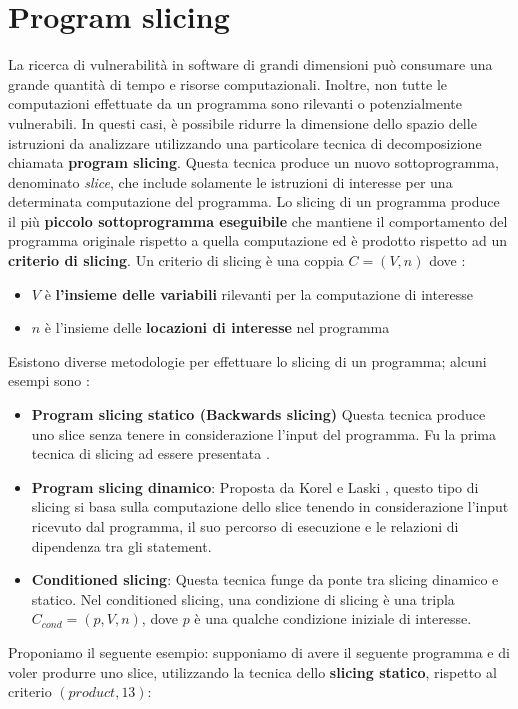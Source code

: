 \documentclass[../main.tex]{subfiles}
\begin{document}
\section{Program slicing}
La ricerca di vulnerabilità in software di grandi dimensioni può consumare una grande quantità di tempo e risorse computazionali.
Inoltre, non tutte le computazioni effettuate da un programma sono rilevanti o potenzialmente vulnerabili. 
In questi casi, è possibile ridurre la dimensione dello spazio delle istruzioni da analizzare utilizzando una particolare tecnica di decomposizione
chiamata \textbf{program slicing}.
Questa tecnica produce un nuovo sottoprogramma, denominato \textit{slice}, che include solamente le istruzioni di interesse per una determinata computazione del programma.
Lo slicing di un programma produce il più \textbf{piccolo sottoprogramma eseguibile} che mantiene il comportamento del programma originale rispetto a quella computazione ed è prodotto rispetto ad un \textbf{criterio di slicing}.
Un criterio di slicing è una coppia $C = (V, n)$ dove \cite{Sclicing}:
\begin{itemize}
    \item $V$ è \textbf{l'insieme delle variabili} rilevanti per la computazione di interesse
    \item $n$ è l'insieme delle \textbf{locazioni di interesse} nel programma 
\end{itemize}
Esistono diverse metodologie per effettuare lo slicing di un programma; alcuni esempi sono \cite{Sclicing}:
\begin{itemize}
    \item \textbf{Program slicing statico (Backwards slicing)} Questa tecnica produce uno slice senza tenere in considerazione l'input del programma. Fu la prima tecnica di slicing ad essere presentata \cite{weiser1981program}.
    \item \textbf{Program slicing dinamico}: Proposta da Korel e Laski \cite{korel1988dynamic}, questo tipo di slicing si basa sulla computazione dello slice tenendo in considerazione l'input ricevuto dal programma, il suo percorso di esecuzione e le relazioni di dipendenza tra gli statement.
    \item \textbf{Conditioned slicing}: Questa tecnica funge da ponte tra slicing dinamico e statico. Nel conditioned slicing, una condizione di slicing è una tripla $C_{cond} = (p, V, n)$, dove $p$ è una qualche condizione iniziale di interesse.
\end{itemize}
\newpage \noindent
Proponiamo il seguente esempio: supponiamo di avere il seguente programma e di voler produrre uno slice, utilizzando la tecnica dello \textbf{slicing statico}, rispetto al criterio $(product, 13)$:


\end{document}
